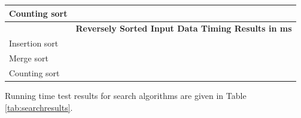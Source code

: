 \documentclass[11pt]{article}
\begin{document}
\begin{table}[ht!]
{\begin{tabular}{|l|l|l|l|l|l|l|l|l|l|l|}
Counting sort                                    &     &      &      &      &      &       &       &       &        &        \\ \hline
                                               & \multicolumn{10}{c|}{\textbf{Reversely Sorted Input Data Timing Results in ms}}                          \\ \hline
Insertion sort                                 &     &      &      &      &      &       &       &       &        &        \\ \hline
Merge sort                                     &     &      &      &      &      &       &       &       &        &        \\ \hline
Counting sort                                    &     &      &      &      &      &       &       &       &        &       \\ \hline
\end{tabular}
}
\end{table}


Running time test results for search algorithms are given in Table \ref{tab:searchresults}. 

\begin{table}[ht!]
\centering
\caption{Results of the running time tests of search algorithms of varying sizes (in ns).}
\label{tab:searchresults}
\end{table}
\end{document}
